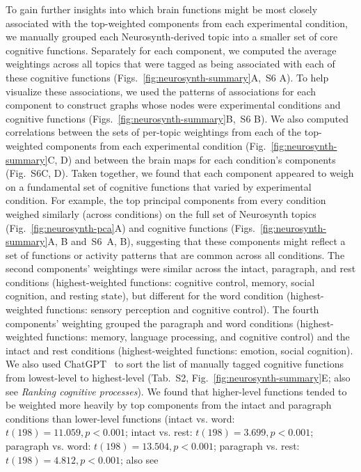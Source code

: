 \documentclass[english, 11pt]{article}
\newcommand{\neurosynthFull}{S6} %
\newcommand{\topicTags}{S2}
\begin{document}
To gain further insights into which brain functions might be most closely
associated with the top-weighted components from each experimental condition,
we manually grouped each Neurosynth-derived topic into a smaller set of core
cognitive functions. Separately for each component, we computed the average
weightings across all topics that were tagged as being associated with each of
these cognitive functions (Figs.~\ref{fig:neurosynth-summary}A,~\neurosynthFull
A). To help visualize these associations, we used the patterns of associations
for each component to construct graphs whose nodes were experimental conditions
and cognitive functions (Figs.~\ref{fig:neurosynth-summary}B,~\neurosynthFull
B). We also computed correlations between the sets of per-topic weightings from
each of the top-weighted components from each experimental condition
(Fig.~\ref{fig:neurosynth-summary}C, D) and between the brain maps for each
condition's components (Fig.~\neurosynthFull C, D). Taken together, we found
that each component appeared to weigh on a fundamental set of cognitive
functions that varied by experimental condition. For example, the top principal
components from every condition weighed similarly (across conditions) on the
full set of Neurosynth topics (Fig.~\ref{fig:neurosynth-pca}A) and cognitive
functions (Figs.~\ref{fig:neurosynth-summary}A, B and~\neurosynthFull~A, B),
suggesting that these components might reflect a set of functions or activity
patterns that are common across all conditions. The second components'
weightings were similar across the intact, paragraph, and rest conditions
(highest-weighted functions: cognitive control, memory, social cognition, and
resting state), but different for the word condition (highest-weighted
functions: sensory perception and cognitive control). The fourth components'
weighting grouped the paragraph and word conditions (highest-weighted
functions: memory, language processing, and cognitive control) and the intact
and rest conditions (highest-weighted functions: emotion, social cognition). We
also used ChatGPT~\citep{ChatGPT} to sort the list of manually tagged cognitive
functions from lowest-level to highest-level (Tab.~\topicTags,
Fig.~\ref{fig:neurosynth-summary}E; also see \textit{Ranking cognitive
processes}). We found that higher-level functions tended to be weighted more
heavily by top components from the intact and paragraph conditions than
lower-level functions (intact vs. word: $t(198) = 11.059, p < 0.001$; intact
vs. rest: $t(198) = 3.699, p < 0.001$; paragraph vs. word: $t(198) = 13.504, p
< 0.001$; paragraph vs. rest: $t(198) = 4.812, p < 0.001$; also see
\end{document}
